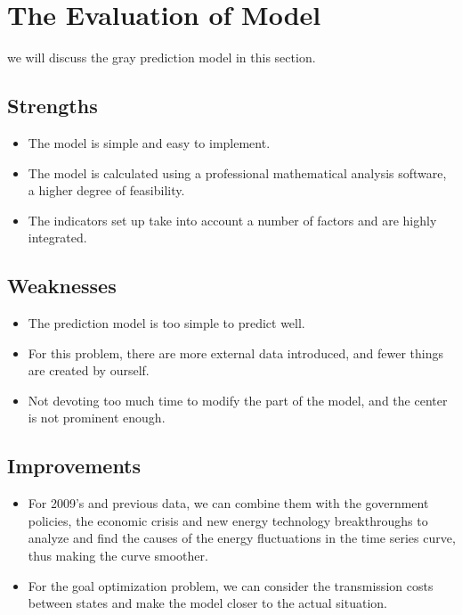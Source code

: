 \documentclass{mcmthesis}
\newcommand{\rmnum}[1]{\romannumeral #1}
\begin{document}
\section{The Evaluation of Model}

we will discuss the gray prediction model in this section.
\subsection{Strengths}
\begin{itemize}
  \item The model is simple and easy to implement.
  \item The model is calculated using a professional mathematical analysis software, a higher degree of feasibility.
  \item The indicators set up take into account a number of factors and are highly integrated.
\end{itemize}
\subsection{Weaknesses}
\begin{itemize}
  \item The prediction model is too simple to predict well.
  \item For this problem, there are more external data introduced, and fewer things are created by ourself.
  \item Not devoting too much time to modify the part of the model, and the center is not prominent enough.
\end{itemize}
\subsection{Improvements}
\begin{itemize}
  \item For 2009's and previous data, we can combine them with the government policies, the economic crisis and new energy technology breakthroughs to analyze and find the causes of the energy fluctuations in the time series curve, thus making the curve smoother.
  \item For the goal optimization problem, we can consider the transmission costs between states and make the model closer to the actual situation.
\end{itemize}

\newpage
\setcounter{page}{2}
\pagestyle{fancy} 
\rhead{\small\sffamily  \rmnum{\thepage}}
\end{document}

